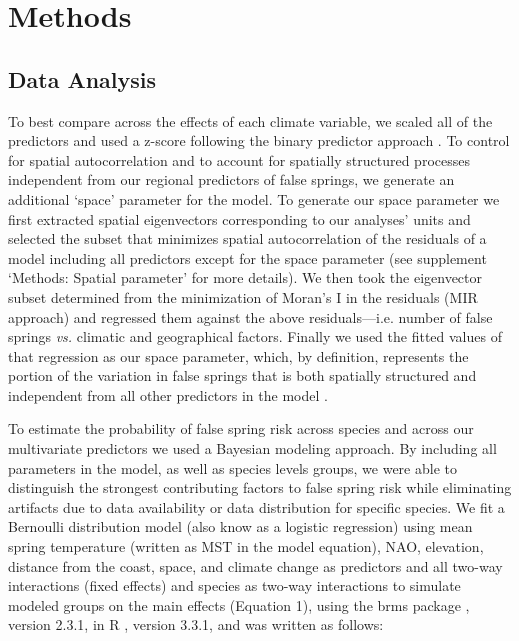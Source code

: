 \documentclass{article}\usepackage[]{graphicx}\usepackage[]{color}
\begin{document}
\renewcommand{\thetable}{\arabic{table}}
\renewcommand{\thefigure}{\arabic{figure}}
\renewcommand{\labelitemi}{$-$}


\section*{Methods}
\subsection*{Data Analysis} 
To best compare across the effects of each climate variable, we scaled all of the predictors and used a z-score following the binary predictor approach \citep{Gelman2006}. To control for spatial autocorrelation and to account for spatially structured processes independent from our regional predictors of false springs, we generate an additional `space' parameter for the model. To generate our space parameter we first extracted spatial eigenvectors corresponding to our analyses' units and selected the subset that minimizes spatial autocorrelation of the residuals of a model including all predictors except for the space parameter \citep{diniz2012selection,Baumen2017} (see supplement `Methods: Spatial parameter' for more details). We then took the eigenvector subset determined from the minimization of Moran's I in the residuals (MIR approach) and regressed them against the above residuals---i.e. number of false springs \emph{vs.} climatic and geographical factors. Finally we used the fitted values of that regression as our space parameter, which, by definition, represents the portion of the variation in false springs that is both spatially structured and independent from all other predictors in the model \citep[e.g. average spring temperature, elevation, etc.][]{griffith2006spatial,morales2012imprint}. 

To estimate the probability of false spring risk across species and across our multivariate predictors we used a Bayesian modeling approach. By including all parameters in the model, as well as species levels groups, we were able to distinguish the strongest contributing factors to false spring risk while eliminating artifacts due to data availability or data distribution for specific species. We fit a Bernoulli distribution model (also know as a logistic regression) using mean spring temperature (written as MST in the model equation), NAO, elevation, distance from the coast, space, and climate change as predictors and all two-way interactions (fixed effects) and species as two-way interactions to simulate modeled groups on the main effects (Equation 1), using the brms package \citep{brms}, version 2.3.1,  in R \citep{R}, version 3.3.1, and was written as follows:
\end{document}

